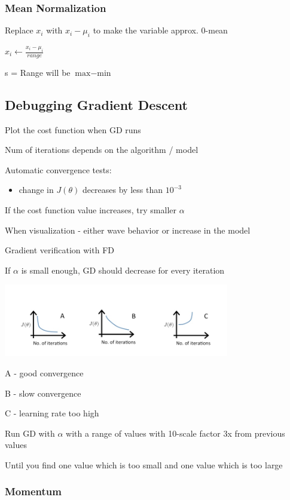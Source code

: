 \subsubsection{Mean Normalization}

Replace $x_i$ with $x_i - \mu_i$ to make the variable approx. 0-mean

$x_i \leftarrow \frac{x_i-\mu_i}{range}$

s = Range will be $\text{max}-\text{min}$

\subsection{Debugging Gradient Descent}

Plot the cost function when GD runs

Num of iterations depends on the algorithm / model

Automatic convergence tests:

\begin{itemize}
\item change in $J(\theta)$ decreases by less than $10^{-3}$
\end{itemize}

If the cost function value increases, try smaller $\alpha$

When visualization - either wave behavior or increase in the model

Gradient verification with FD

If $\alpha$ is small enough, GD should decrease for every iteration

\includegraphics[width=0.9\columnwidth]{ml_figures/convergence.png}

A - good convergence

B - slow convergence

C - learning rate too high

Run GD with $\alpha$ with a range of values with 10-scale factor  3x from previous values

Until you find one value which is too small and one value which is too large

\subsubsection{Momentum}

